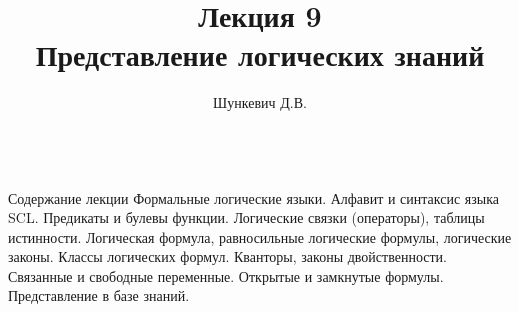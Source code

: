 \title{Лекция 9\\Представление логических знаний}
\author[]{Шункевич Д.В.}

\begin{frame}
	\titlepage
\end{frame}

\begin{frame}{\\Содержание лекции}
	\topline
	\justifying
	Формальные логические языки. Алфавит и синтаксис языка SCL. Предикаты и булевы функции. Логические связки (операторы), таблицы истинности. Логическая формула, равносильные логические формулы, логические законы. Классы логических формул. Кванторы, законы двойственности. Связанные и свободные переменные. Открытые и замкнутые формулы. Представление в базе знаний.
\end{frame}